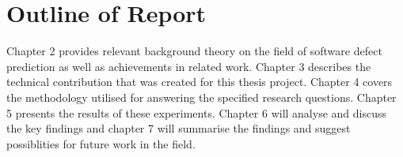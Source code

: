 \documentclass[../main.tex]{subfiles}
\begin{document}
\section{Outline of Report}
Chapter 2 provides relevant background theory on the field of software defect prediction as well as achievements in related work. Chapter 3 describes the technical contribution that was created for this thesis project. Chapter 4 covers the methodology utilised for answering the specified research questions. Chapter 5 presents the results of these experiments. Chapter 6 will analyse and discuss the key findings and chapter 7 will summarise the findings and suggest possiblities for future work in the field. 
\end{document}
